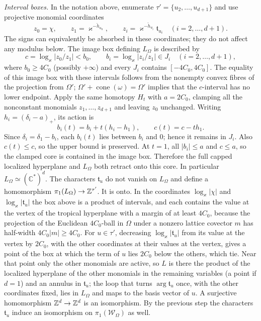 \emph{Interval boxes.}
In the notation above, enumerate $\tau'=\{u_2,\ldots,u_{d+1}\}$ and use projective monomial
coordinates
\[
 z_0=\chi,\qquad z_1=\varkappa^{-\check h_{u_0}},\qquad
 z_i=\varkappa^{-\check h_{u_i}}\mathfrak t_{u_i}\quad (i=2,\ldots,d+1).
\]
The signs can equivalently be absorbed in these coordinates; they do not affect
any modulus below. The image box defining $L_\Omega$ is described by
\[
 c=\log_\varkappa|z_0/z_1|<b_0,\qquad
 b_i=\log_\varkappa|z_i/z_1|\in J_i\quad (i=2,\ldots,d+1),
\]
where $b_0\ge4C_0$ (possibly $+\infty$) and every $J_i$ contains
$[-4C_0,4C_0]$. The equality of this image box with these intervals follows
from the nonempty convex fibres of the projection from $\Omega'$;
$\Omega'+\operatorname{cone}(\omega)=\Omega'$ implies that the $c$-interval
has no lower endpoint. Apply the same homotopy $H_t$ with $a=2C_0$, clamping
all the nonconstant monomials $z_1,\ldots,z_{d+1}$ and leaving $z_0$ unchanged.
Writing $h_i=(\delta_i-a)_+$, its action is
\[
 b_i(t)=b_i+t(h_i-h_1),\qquad c(t)=c-th_1.
\]
Since $\delta_i=\delta_1-b_i$, each $b_i(t)$ lies between $b_i$ and $0$;
hence it remains in $J_i$. Also $c(t)\le c$, so the upper bound is preserved.
At $t=1$, all $|b_i|\le a$ and $c\le a$, so the clamped core is contained in
the image box. Therefore the full capped localized hyperplane and
$L_\Omega$ both retract onto this core. In particular
$L_\Omega\simeq(\mathbb C^*)^d$. The characters $\mathfrak t_u$ do not vanish on $L_\Omega$ and define a homomorphism $\pi_1(L_\Omega)\to\mathbb Z^{\tau'}$. It is onto. In the coordinates $\log_\varkappa|\chi|$ and $\log_\varkappa|\mathfrak t_u|$ the box above is a product of intervals, and each contains the value at the vertex of the tropical hyperplane with a margin of at least $4C_0$, because the projection of the Euclidean $4C_0$-ball in $\Omega$ under a nonzero lattice covector $m$ has half-width
$4C_0|m|\ge4C_0$. For $u\in\tau'$, decreasing $\log_\varkappa|\mathfrak t_u|$ from its value at the vertex by $2C_0$, with the other coordinates at their values at the vertex, gives a point of the box at which the term of $u$ lies $2C_0$ below the others, which tie. Near that point only the other monomials are active, so $L$ is there the product of the localized hyperplane of the other monomials in the remaining variables (a point if $d=1$) and an annulus in $\mathfrak t_u$; the loop that turns $\arg \mathfrak t_u$ once, with the other coordinates fixed, lies in $L_\Omega$ and maps to the basis vector of $u$. A surjective homomorphism $\mathbb Z^d\to\mathbb Z^d$ is an isomorphism. By the previous step the characters $\mathfrak t_u$ induce an isomorphism on $\pi_1(\mathscr W_\Omega)$ as well.

